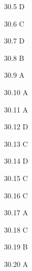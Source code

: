 \begin{Solution}{30.{5}}
D
\end{Solution}
\begin{Solution}{30.{6}}
C
\end{Solution}
\begin{Solution}{30.{7}}
D
\end{Solution}
\begin{Solution}{30.{8}}
B
\end{Solution}
\begin{Solution}{30.{9}}
A
\end{Solution}
\begin{Solution}{30.{10}}
A
\end{Solution}
\begin{Solution}{30.{11}}
A
\end{Solution}
\begin{Solution}{30.{12}}
D
\end{Solution}
\begin{Solution}{30.{13}}
C
\end{Solution}
\begin{Solution}{30.{14}}
D
\end{Solution}
\begin{Solution}{30.{15}}
C
\end{Solution}
\begin{Solution}{30.{16}}
C
\end{Solution}
\begin{Solution}{30.{17}}
A
\end{Solution}
\begin{Solution}{30.{18}}
C
\end{Solution}
\begin{Solution}{30.{19}}
B
\end{Solution}
\begin{Solution}{30.{20}}
A
\end{Solution}
